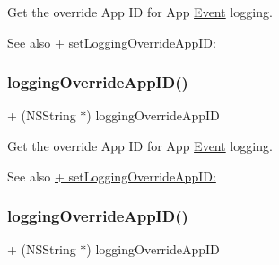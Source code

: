 Get the \textquotesingle{}override\textquotesingle{} App ID for App \hyperlink{classEvent}{Event} logging.

\begin{DoxySeeAlso}{See also}
{\ttfamily \hyperlink{interfaceFBAppEvents_a3f9d06a1e8b3d482efc5c438827fbc6e}{+ set\+Logging\+Override\+App\+I\+D\+:}} 
\end{DoxySeeAlso}
\mbox{\label{interfaceFBAppEvents_a1aa76011dcc7ab662780b05cfcc65f38}} 
\subsubsection{\texorpdfstring{logging\+Override\+App\+I\+D()}{loggingOverrideAppID()}\hspace{0.1cm}{\footnotesize\ttfamily [2/5]}}
{\footnotesize\ttfamily + (N\+S\+String $\ast$) logging\+Override\+App\+ID \begin{DoxyParamCaption}{ }\end{DoxyParamCaption}}

Get the \textquotesingle{}override\textquotesingle{} App ID for App \hyperlink{classEvent}{Event} logging.

\begin{DoxySeeAlso}{See also}
{\ttfamily \hyperlink{interfaceFBAppEvents_a3f9d06a1e8b3d482efc5c438827fbc6e}{+ set\+Logging\+Override\+App\+I\+D\+:}} 
\end{DoxySeeAlso}
\mbox{\label{interfaceFBAppEvents_a1aa76011dcc7ab662780b05cfcc65f38}} 
\subsubsection{\texorpdfstring{logging\+Override\+App\+I\+D()}{loggingOverrideAppID()}\hspace{0.1cm}{\footnotesize\ttfamily [3/5]}}
{\footnotesize\ttfamily + (N\+S\+String $\ast$) logging\+Override\+App\+ID \begin{DoxyParamCaption}{ }\end{DoxyParamCaption}}

